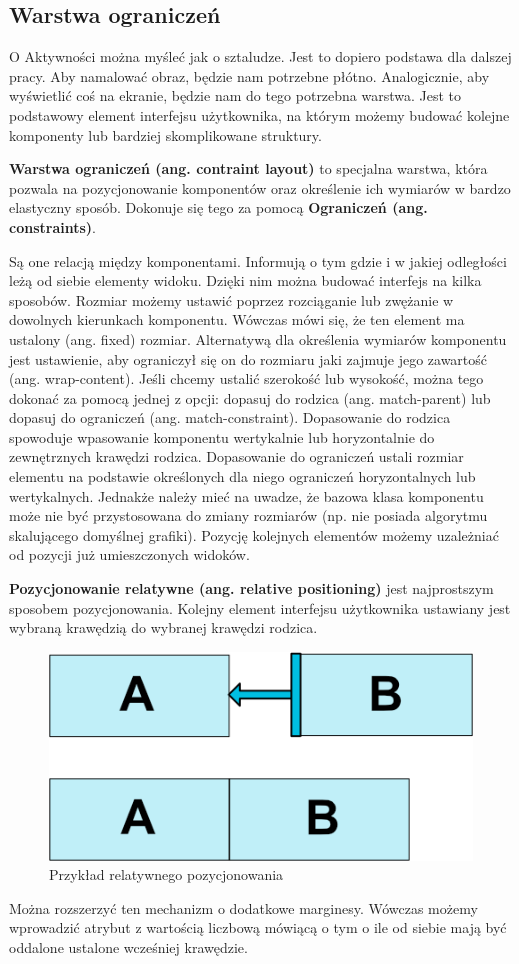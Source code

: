 \documentclass{article}
\numberwithin{equation}{section}
\begin{document}
\subsection{Warstwa ograniczeń}
O Aktywności można myśleć jak o sztaludze. Jest to dopiero podstawa dla dalszej pracy. Aby namalować obraz, będzie nam potrzebne płótno. Analogicznie, aby wyświetlić coś na ekranie, będzie nam do tego potrzebna warstwa. Jest to podstawowy element interfejsu użytkownika, na którym możemy budować kolejne komponenty lub bardziej skomplikowane struktury.\par\textbf{Warstwa ograniczeń (ang. contraint layout)} to specjalna warstwa, która pozwala na pozycjonowanie komponentów oraz określenie ich wymiarów w bardzo elastyczny sposób. Dokonuje się tego za pomocą \textbf{Ograniczeń (ang. constraints)}.\par Są one relacją między komponentami. Informują o tym gdzie i w jakiej odległości leżą od siebie elementy widoku. Dzięki nim można budować interfejs na kilka sposobów. Rozmiar możemy ustawić poprzez rozciąganie lub zwężanie w dowolnych kierunkach komponentu. Wówczas mówi się, że ten element ma ustalony (ang. fixed) rozmiar. Alternatywą dla określenia wymiarów komponentu jest ustawienie, aby ograniczył się on do rozmiaru jaki zajmuje jego zawartość (ang. wrap-content). Jeśli chcemy ustalić szerokość lub wysokość, można tego dokonać za pomocą jednej z opcji: dopasuj do rodzica (ang. match-parent) lub dopasuj do ograniczeń (ang. match-constraint). Dopasowanie do rodzica spowoduje wpasowanie komponentu wertykalnie lub horyzontalnie do zewnętrznych krawędzi rodzica. Dopasowanie do ograniczeń ustali rozmiar elementu na podstawie określonych dla niego ograniczeń horyzontalnych lub wertykalnych. Jednakże należy mieć na uwadze, że bazowa klasa komponentu może nie być przystosowana do zmiany rozmiarów (np. nie posiada algorytmu skalującego domyślnej grafiki). Pozycję kolejnych elementów możemy uzależniać od pozycji już umieszczonych widoków.\par \textbf{Pozycjonowanie relatywne (ang. relative positioning)} jest najprostszym sposobem pozycjonowania. Kolejny element interfejsu użytkownika ustawiany jest wybraną krawędzią do wybranej krawędzi rodzica. 
\begin{figure}[H]
\centering
\includegraphics[scale=0.7]{relative-positioning.png}
\caption{Przykład relatywnego pozycjonowania\citep{constraintlayout}}
\end{figure} Można rozszerzyć ten mechanizm o dodatkowe marginesy. Wówczas możemy wprowadzić atrybut z wartością liczbową mówiącą o tym o ile od siebie mają być oddalone ustalone wcześniej krawędzie. \citep{constraintlayout}
\end{document}
